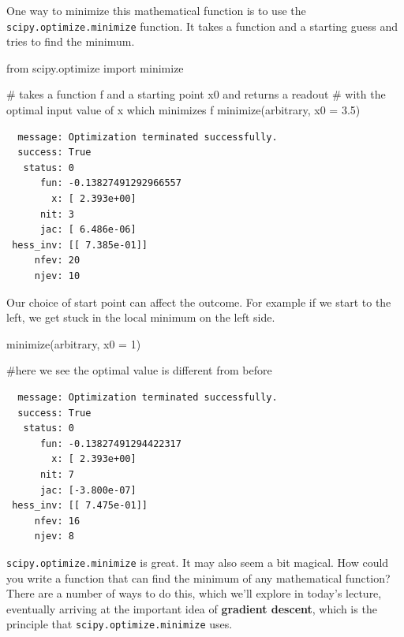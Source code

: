 \documentclass[
  letterpaper,
  DIV=11,
  numbers=noendperiod]{scrreprt}
\newenvironment{Shaded}{\begin{snugshade}}{\end{snugshade}}
\newcommand{\CommentTok}[1]{\textcolor[rgb]{0.37,0.37,0.37}{#1}}
\newcommand{\DecValTok}[1]{\textcolor[rgb]{0.68,0.00,0.00}{#1}}
\newcommand{\FloatTok}[1]{\textcolor[rgb]{0.68,0.00,0.00}{#1}}
\newcommand{\ImportTok}[1]{\textcolor[rgb]{0.00,0.46,0.62}{#1}}
\newcommand{\NormalTok}[1]{\textcolor[rgb]{0.00,0.23,0.31}{#1}}
\newcommand{\OperatorTok}[1]{\textcolor[rgb]{0.37,0.37,0.37}{#1}}
\begin{document}
One way to minimize this mathematical function is to use the
\texttt{scipy.optimize.minimize} function. It takes a function and a
starting guess and tries to find the minimum.

\begin{Shaded}
\begin{Highlighting}[]
\ImportTok{from}\NormalTok{ scipy.optimize }\ImportTok{import}\NormalTok{ minimize}

\CommentTok{\# takes a function f and a starting point x0 and returns a readout }
\CommentTok{\# with the optimal input value of x which minimizes f}
\NormalTok{minimize(arbitrary, x0 }\OperatorTok{=} \FloatTok{3.5}\NormalTok{)}
\end{Highlighting}
\end{Shaded}

\begin{verbatim}
  message: Optimization terminated successfully.
  success: True
   status: 0
      fun: -0.13827491292966557
        x: [ 2.393e+00]
      nit: 3
      jac: [ 6.486e-06]
 hess_inv: [[ 7.385e-01]]
     nfev: 20
     njev: 10
\end{verbatim}

Our choice of start point can affect the outcome. For example if we
start to the left, we get stuck in the local minimum on the left side.

\begin{Shaded}
\begin{Highlighting}[]
\NormalTok{minimize(arbitrary, x0 }\OperatorTok{=} \DecValTok{1}\NormalTok{)}

\CommentTok{\#here we see the optimal value is different from before}
\end{Highlighting}
\end{Shaded}

\begin{verbatim}
  message: Optimization terminated successfully.
  success: True
   status: 0
      fun: -0.13827491294422317
        x: [ 2.393e+00]
      nit: 7
      jac: [-3.800e-07]
 hess_inv: [[ 7.475e-01]]
     nfev: 16
     njev: 8
\end{verbatim}

\texttt{scipy.optimize.minimize} is great. It may also seem a bit
magical. How could you write a function that can find the minimum of any
mathematical function? There are a number of ways to do this, which
we'll explore in today's lecture, eventually arriving at the important
idea of \textbf{gradient descent}, which is the principle that
\texttt{scipy.optimize.minimize} uses.
\end{document}
